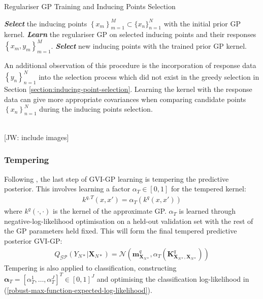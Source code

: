 \documentclass{article}
\newcommand{\jw}[1]{{\color{gray} [JW: #1]}}
\newcommand{\GP}{\operatorname{\mathcal{GP}}}
\numberwithin{equation}{section}
\begin{document}
\begin{algorithm}
\caption{Regulariser GP Training and Inducing Points Selection}\label{alg:gvi-gp}
\begin{algorithmic}
 \State \textbf{\textit{Select}} the inducing points $\left\{x_m\right\}_{m=1}^{M} \subset \{x_n\}_{n=1}^{N}$ with the initial prior GP kernel.
\State \textbf{\textit{Learn}} the regulariser GP on selected inducing points and their responses $\left\{x_m, y_m\right\}_{m=1}^{M}$.
\State  \textbf{\textit{Select}} new inducing points with the trained prior GP kernel.
\EndWhile
\end{algorithmic}
\end{algorithm}
An additional observation of this procedure is the incorporation of response data $\left\{y_n\right\}_{n=1}^N$ into the selection process which did not exist in the greedy selection in Section \ref{section:inducing-point-selection}. Learning the kernel with the response data can give more appropriate covariances when comparing candidate points $\left\{x_n\right\}_{n=1}^N$ during the inducing points selection.

\\\jw{include images}

\subsubsection{Tempering}
Following \cite{wild2022generalized}, the last step of GVI-GP learning is tempering the predictive posterior. This involves learning a factor $\alpha_T \in [0, 1]$ for the tempered kernel:
\begin{align}
    k^{q, T}(x, x') = \alpha_T \left( k^q(x, x')\right)
\end{align}
where $k^q(\cdot, \cdot)$ is the kernel of the approximate GP. $\alpha_T$ is learned through negative-log-likelihood optimisation on a held-out validation set with the rest of the GP parameters held fixed. This will form the final tempered predictive posterior GVI-GP:
\begin{align}
    Q_{\GP}(Y_{N*} \vert \mathbf{X}_{N*}) = \mathcal{N}\left(\mathbf{m}^q_{\mathbf{X}_{N*}}, \alpha_T \left(\mathbf{K}^q_{\mathbf{X}_{N*}, \mathbf{X}_{N*}}\right)\right)
\end{align}
 Tempering is also applied to classification, constructing $\boldsymbol{\alpha}_T = \left[\alpha_T^1, \dots, \alpha_T^J \right]^T \in [0, 1]^J$ and optimising the classification log-likelihood in (\ref{robust-max-function-expected-log-likelihood}).
\end{document}
